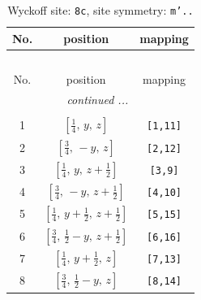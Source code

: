 \documentclass[fleqn,8pt]{jsarticle}
\begin{document}
\begin{longtable}{ccc}
\caption{Wyckoff site: {\tt 8c}, site symmetry: {\tt m'..}}
 \\
 \hline \hline
No. & position & mapping \\ \hline \endfirsthead

\multicolumn{2}{l}{\tablename\ \thetable{}} \\
 \hline \hline
No. & position & mapping \\ \hline \endhead

 \hline \hline
\multicolumn{2}{r}{\footnotesize\it continued ...} \\ \endfoot

 \hline \hline
\multicolumn{2}{r}{} \\ \endlastfoot

1 & $\left[ \frac{1}{4},\, y,\, z \right]$ & {\tt [1,11]} \\ \hline
2 & $\left[ \frac{3}{4},\, - y,\, z \right]$ & {\tt [2,12]} \\ \hline
3 & $\left[ \frac{1}{4},\, y,\, z + \frac{1}{2} \right]$ & {\tt [3,9]} \\ \hline
4 & $\left[ \frac{3}{4},\, - y,\, z + \frac{1}{2} \right]$ & {\tt [4,10]} \\ \hline
5 & $\left[ \frac{1}{4},\, y + \frac{1}{2},\, z + \frac{1}{2} \right]$ & {\tt [5,15]} \\ \hline
6 & $\left[ \frac{3}{4},\, \frac{1}{2} - y,\, z + \frac{1}{2} \right]$ & {\tt [6,16]} \\ \hline
7 & $\left[ \frac{1}{4},\, y + \frac{1}{2},\, z \right]$ & {\tt [7,13]} \\ \hline
8 & $\left[ \frac{3}{4},\, \frac{1}{2} - y,\, z \right]$ & {\tt [8,14]} \\
\end{longtable}
\renewcommand{\arraystretch}{1.2}
\end{document}
